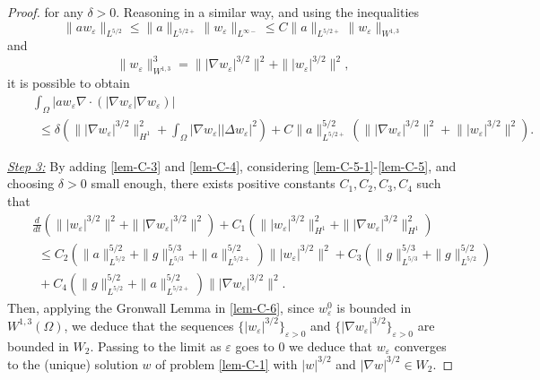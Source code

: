 \documentclass[11pt,reqno]{amsart}%
\numberwithin{equation}{section}
\begin{document}
{\begin{proof}
  for any $\delta>0$.
%
Reasoning in a similar way, and using the inequalities
$$
\|a w_\varepsilon\|_{L^{5/2}}
\le \|a\|_{L^{5/2+}}\|w_\varepsilon\|_{L^{\infty-}}
\le C \|a\|_{L^{5/2+}}\|w_\varepsilon\|_{W^{1,3}}
$$
and $$
\|w_\varepsilon\|_{W^{1,3}}^3
=
\||\nabla w_\varepsilon|^{3/2}\|^{2}+\| |w_\varepsilon|^{3/2}\|^{2},
$$
 it is possible to obtain
 \hspace{-0.3cm}\begin{eqnarray}
&&\int_\Omega|a w_\varepsilon\nabla\cdot(|\nabla w_\varepsilon|\nabla w_\varepsilon)|
 \nonumber\\
&&\ \ \le \delta\left(\!\||\nabla w_\varepsilon|^{3/2}\|^2_{H^1}\!+\!\int_\Omega|\nabla w_\varepsilon||\Delta w_\varepsilon|^2\!\right) 
\!+\!C\|a\|^{5/2}_{L^{5/2+}}
\left(\!
\||\nabla w_\varepsilon|^{3/2}\|^2 \!+\! \||w_\varepsilon|^{3/2}\|^2
\!\right).
\label{lem-C-5}
 \end{eqnarray} 

 
  \noindent\underline{\it Step 3:}  
 By adding \eqref{lem-C-3} and \eqref{lem-C-4}, considering \eqref{lem-C-5-1}-\eqref{lem-C-5}, and choosing $\delta>0$ small enough, there exists positive constants $C_1,C_2,C_3,C_4$ such that
 \begin{eqnarray}
&& \frac{d}{dt}\left(\||w_\varepsilon|^{3/2}\|^2+\||\nabla w_\varepsilon|^{3/2}\|^2\right)
 +C_1\left(\||w_\varepsilon|^{3/2}\|^2_{H^1}+\||\nabla w_\varepsilon|^{3/2}\|^2_{H^1}\right)\nonumber\\
&&
\ \ \le {C}_2\left(\|a\|^{5/2}_{L^{5/2}}+\|g\|_{L^{5/3}}^{5/3}
+
 \|a\|^{5/2}_{L^{5/2+}}
 \right)\||w_\varepsilon|^{3/2}\|^2
 +{C}_3\left(\|g\|^{5/3}_{L^{5/3}}+\|g\|^{5/2}_{L^{5/2}}\right)
 \nonumber\\
 &&
 \ \ +{C}_4\left(\|g\|^{5/2}_{L^{5/2}} + \|a\|^{5/2}_{L^{5/2+}} \right)
 \||\nabla w_\varepsilon|^{3/2}\|^2 .
\label{lem-C-6}
 \end{eqnarray}
 Then, applying the Gronwall Lemma in \eqref{lem-C-6}, since $w_\varepsilon^0$ is bounded in  $W^{1,3}(\Omega)$,  we deduce that the sequences $\{|w_\varepsilon|^{3/2}\}_{\varepsilon>0}$ and $\{|\nabla w_\varepsilon|^{3/2}\}_{\varepsilon>0}$ are bounded in $W_2$. %
 Passing to the limit as $\varepsilon$ goes to 0 we deduce that $w_\varepsilon$ converges to the (unique) solution $w$ of problem \eqref{lem-C-1} with  
 $|w|^{3/2}$ and $|\nabla w|^{3/2}\in W_2$.
 \end{proof}
 
}
\end{document}
